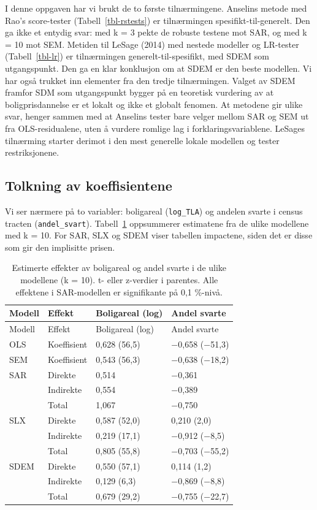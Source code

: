 \documentclass[
  norsk,
  a4paper,
]{article}
\begin{document}
I denne oppgaven har vi brukt de to første tilnærmingene. Anselins
metode med Rao's score-tester (Tabell~\ref{tbl-rstests}) er tilnærmingen
spesifikt-til-generelt. Den ga ikke et entydig svar: med k = 3 pekte de
robuste testene mot SAR, og med k = 10 mot SEM. Metiden til LeSage
(2014) med nestede modeller og LR-tester (Tabell~\ref{tbl-lr}) er
tilnærmingen generelt-til-spesifikt, med SDEM som utgangspunkt. Den ga
en klar konklusjon om at SDEM er den beste modellen. Vi har også trukket
inn elementer fra den tredje tilnærmingen. Valget av SDEM framfor SDM
som utgangspunkt bygger på en teoretisk vurdering av at
boligprisdannelse er et lokalt og ikke et globalt fenomen. At metodene
gir ulike svar, henger sammen med at Anselins tester bare velger mellom
SAR og SEM ut fra OLS-residualene, uten å vurdere romlige lag i
forklaringsvariablene. LeSages tilnærming starter derimot i den mest
generelle lokale modellen og tester restriksjonene.

\subsection{Tolkning av
koeffisientene}\label{tolkning-av-koeffisientene}

Vi ser nærmere på to variabler: boligareal (\texttt{log\_TLA}) og
andelen svarte i census tracten (\texttt{andel\_svart}).
Tabell~\ref{tbl-diskusjon} oppsummerer estimatene fra de ulike modellene
med k = 10. For SAR, SLX og SDEM viser tabellen impactene, siden det er
disse som gir den implisitte prisen.

\begin{longtable}[]{@{}llll@{}}
\caption{Estimerte effekter av boligareal og andel svarte i de ulike
modellene (k = 10). t- eller z-verdier i parentes. Alle effektene i
SAR-modellen er signifikante på 0,1
\%-nivå.}\label{tbl-diskusjon}\tabularnewline
\toprule\noalign{}
Modell & Effekt & Boligareal (log) & Andel svarte \\
\midrule\noalign{}
\endfirsthead
\toprule\noalign{}
Modell & Effekt & Boligareal (log) & Andel svarte \\
\midrule\noalign{}
\endhead
\bottomrule\noalign{}
\endlastfoot
OLS & Koeffisient & 0,628 (56,5) & −0,658 (−51,3) \\
SEM & Koeffisient & 0,543 (56,3) & −0,638 (−18,2) \\
SAR & Direkte & 0,514 & −0,361 \\
& Indirekte & 0,554 & −0,389 \\
& Total & 1,067 & −0,750 \\
SLX & Direkte & 0,587 (52,0) & 0,210 (2,0) \\
& Indirekte & 0,219 (17,1) & −0,912 (−8,5) \\
& Total & 0,805 (55,8) & −0,703 (−55,2) \\
SDEM & Direkte & 0,550 (57,1) & 0,114 (1,2) \\
& Indirekte & 0,129 (6,3) & −0,869 (−8,8) \\
& Total & 0,679 (29,2) & −0,755 (−22,7) \\
\end{longtable}
\end{document}
